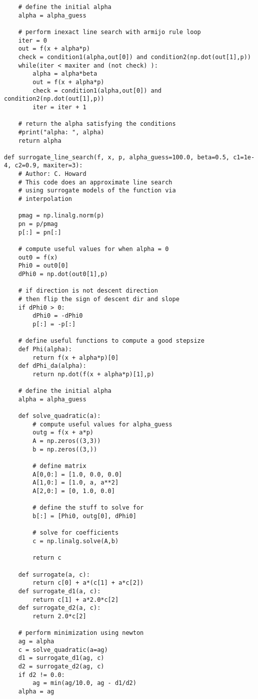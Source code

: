 {\begin{verbatim}
    # define the initial alpha
    alpha = alpha_guess

    # perform inexact line search with armijo rule loop
    iter = 0
    out = f(x + alpha*p)
    check = condition1(alpha,out[0]) and condition2(np.dot(out[1],p))
    while(iter < maxiter and (not check) ):
        alpha = alpha*beta
        out = f(x + alpha*p)
        check = condition1(alpha,out[0]) and condition2(np.dot(out[1],p))
        iter = iter + 1

    # return the alpha satisfying the conditions
    #print("alpha: ", alpha)
    return alpha

def surrogate_line_search(f, x, p, alpha_guess=100.0, beta=0.5, c1=1e-4, c2=0.9, maxiter=3):
    # Author: C. Howard
    # This code does an approximate line search
    # using surrogate models of the function via
    # interpolation

    pmag = np.linalg.norm(p)
    pn = p/pmag
    p[:] = pn[:]

    # compute useful values for when alpha = 0
    out0 = f(x)
    Phi0 = out0[0]
    dPhi0 = np.dot(out0[1],p)

    # if direction is not descent direction
    # then flip the sign of descent dir and slope
    if dPhi0 > 0:
        dPhi0 = -dPhi0
        p[:] = -p[:]

    # define useful functions to compute a good stepsize
    def Phi(alpha):
        return f(x + alpha*p)[0]
    def dPhi_da(alpha):
        return np.dot(f(x + alpha*p)[1],p)

    # define the initial alpha
    alpha = alpha_guess

    def solve_quadratic(a):
        # compute useful values for alpha_guess
        outg = f(x + a*p)
        A = np.zeros((3,3))
        b = np.zeros((3,))

        # define matrix
        A[0,0:] = [1.0, 0.0, 0.0]
        A[1,0:] = [1.0, a, a**2]
        A[2,0:] = [0, 1.0, 0.0]

        # define the stuff to solve for
        b[:] = [Phi0, outg[0], dPhi0]

        # solve for coefficients
        c = np.linalg.solve(A,b)

        return c

    def surrogate(a, c):
        return c[0] + a*(c[1] + a*c[2])
    def surrogate_d1(a, c):
        return c[1] + a*2.0*c[2]
    def surrogate_d2(a, c):
        return 2.0*c[2]

    # perform minimization using newton
    ag = alpha
    c = solve_quadratic(a=ag)
    d1 = surrogate_d1(ag, c)
    d2 = surrogate_d2(ag, c)
    if d2 != 0.0:
        ag = min(ag/10.0, ag - d1/d2)
    alpha = ag
    

\end{verbatim}}
